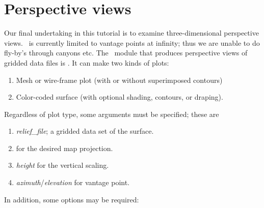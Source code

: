 \documentclass[11pt]{report}
\begin{document}
\section{Perspective views}

Our final undertaking in this tutorial is to examine three-dimensional
perspective views.  \GMT\ is currently limited to vantage points at
infinity; thus we are unable to do fly-by's through canyons etc.  The
\GMT\ module that produces perspective views of gridded data files is
.  It can make two kinds of plots:

\begin{enumerate}

\item Mesh or wire-frame plot (with or without superimposed contours)

\item Color-coded surface (with optional shading, contours, or draping).

\end{enumerate}

Regardless of plot type, some arguments must be specified; these are

\begin{enumerate}

\item \emph{relief\_file}; a gridded data set of the surface.

\item {} for the desired map projection.

\item {}\emph{height} for the vertical scaling.

\item {}\emph{azimuth}/\emph{elevation} for vantage point.

\end{enumerate}


In addition, some options may be required:
\end{document}
